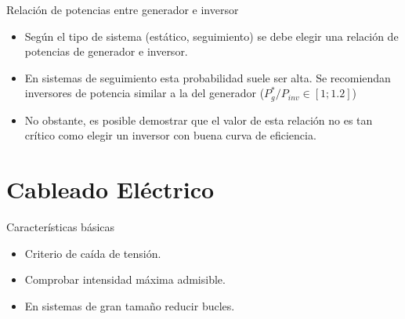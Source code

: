 \documentclass[aspectratio=169, usenames,svgnames,dvipsnames]{beamer}
\begin{document}
\begin{frame}[label={sec:orgcd0b6b8}]{Relación de potencias entre generador e inversor}
\begin{itemize}
\item Según el \alert{tipo de sistema} (estático, seguimiento) se debe elegir una relación de potencias de generador e inversor.

\item En \alert{sistemas de seguimiento} esta probabilidad suele ser alta. Se recomiendan inversores de potencia similar a la del generador  (\(P_{g}^{*}/P_{inv}\in\left[1;1.2\right]\))

\item No obstante, es posible demostrar que el valor de esta relación no es tan crítico como \alert{elegir un inversor con buena curva de eficiencia}.
\end{itemize}
\end{frame}

\section{Cableado Eléctrico}
\label{sec:org6335d27}

\begin{frame}[label={sec:org1af8119}]{Características básicas}
\begin{itemize}
\item Criterio de caída de tensión.

\item Comprobar intensidad máxima admisible.

\item En sistemas de gran tamaño reducir bucles.
\end{itemize}
\end{frame}
\end{document}
